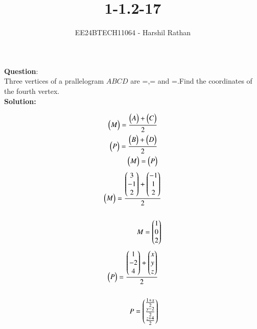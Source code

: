 \documentclass[journal]{IEEEtran}
\begin{document}

\vspace{3cm}

\title{1-1.2-17}
\author{EE24BTECH11064 - Harshil Rathan }
{\let\newpage\relax\maketitle}

\renewcommand{\thefigure}{\theenumi}
\renewcommand{\thetable}{\theenumi}
\setlength{\intextsep}{10pt} %


\renewcommand{\thetable}{\theenumi}
\textbf{Question}:\\
Three vertices of a prallelogram $ABCD$ are =,= and =.Find the coordinates of the fourth vertex.
\\
\textbf{Solution: }
\begin{table}[h!]    
  \centering
  
\end{table}
\begin{align}
    \begin{pmatrix}M\end{pmatrix} = \frac{\begin{pmatrix}A\end{pmatrix}+\begin{pmatrix}C\end{pmatrix}}{2}\\
    \begin{pmatrix}P\end{pmatrix} = \frac{\begin{pmatrix}B\end{pmatrix}+\begin{pmatrix}D\end{pmatrix}}{2}\\
    \begin{pmatrix}M\end{pmatrix} = \begin{pmatrix}P\end{pmatrix}
\end{align}    
\begin{align}    
\begin{pmatrix}M\end{pmatrix}=\frac{\begin{pmatrix}3\\-1\\2\end{pmatrix}+\begin{pmatrix}-1\\1\\2\end{pmatrix}}{2}\\\\
M =\begin{pmatrix}1\\0\\2\end{pmatrix}\\
\end{align}
\begin{align}
\begin{pmatrix}P\end{pmatrix}=\frac{\begin{pmatrix}1\\-2\\4\end{pmatrix}+\begin{pmatrix}x\\y\\z\end{pmatrix}}{2}\\\\
P= \begin{pmatrix}\frac{1+x}{2}\\ \frac{y-2}{2} \\ \frac{z+4}{2}\end{pmatrix}\\
\end{align}
\end{document}
